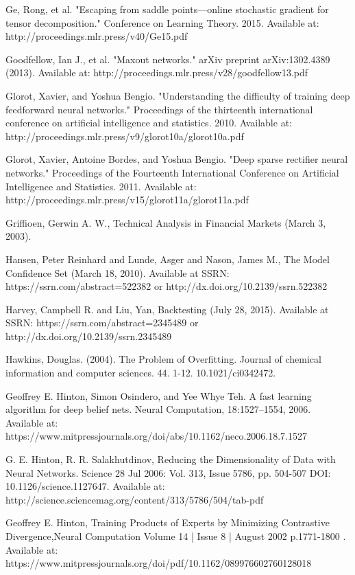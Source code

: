 \documentclass[a4paper,latin]{paper}
\begin{document}
\begin{thebibliography}{9}
Ge, Rong, et al. "Escaping from saddle points—online stochastic gradient for tensor decomposition." Conference on Learning Theory. 2015.
Available at: http://proceedings.mlr.press/v40/Ge15.pdf 

Goodfellow, Ian J., et al. "Maxout networks." arXiv preprint arXiv:1302.4389 (2013).
Available at: http://proceedings.mlr.press/v28/goodfellow13.pdf

Glorot, Xavier, and Yoshua Bengio. "Understanding the difficulty of training deep feedforward neural networks." Proceedings of the thirteenth international conference on artificial intelligence and statistics. 2010.
Available at: http://proceedings.mlr.press/v9/glorot10a/glorot10a.pdf

Glorot, Xavier, Antoine Bordes, and Yoshua Bengio. "Deep sparse rectifier neural networks." Proceedings of the Fourteenth International Conference on Artificial Intelligence and Statistics. 2011.
Available at: http://proceedings.mlr.press/v15/glorot11a/glorot11a.pdf 

Griffioen, Gerwin A. W., Technical Analysis in Financial Markets (March 3, 2003).

Hansen, Peter Reinhard and Lunde, Asger and Nason, James M., The Model Confidence Set (March 18, 2010). Available at SSRN: https://ssrn.com/abstract=522382 or http://dx.doi.org/10.2139/ssrn.522382

Harvey, Campbell R. and Liu, Yan, Backtesting (July 28, 2015). Available at SSRN: https://ssrn.com/abstract=2345489 or http://dx.doi.org/10.2139/ssrn.2345489

Hawkins, Douglas. (2004). The Problem of Overfitting. Journal of chemical information and computer sciences. 44. 1-12. 10.1021/ci0342472. 

Geoffrey E. Hinton, Simon Osindero, and Yee Whye Teh. A fast learning algorithm for deep belief nets. Neural Computation, 18:1527–1554, 2006. 
Available at: https://www.mitpressjournals.org/doi/abs/10.1162/neco.2006.18.7.1527

G. E. Hinton, R. R. Salakhutdinov, Reducing the Dimensionality of Data with Neural 
Networks. Science  28 Jul 2006: Vol. 313, Issue 5786, pp. 504-507 DOI: 
10.1126/science.1127647. Available at: http://science.sciencemag.org/content/313/5786/504/tab-pdf

Geoffrey E. Hinton, Training Products of Experts by Minimizing Contrastive Divergence,Neural Computation
Volume 14 | Issue 8 | August 2002  p.1771-1800 . Available at: https://www.mitpressjournals.org/doi/pdf/10.1162/089976602760128018


\end{thebibliography}
\end{document}
